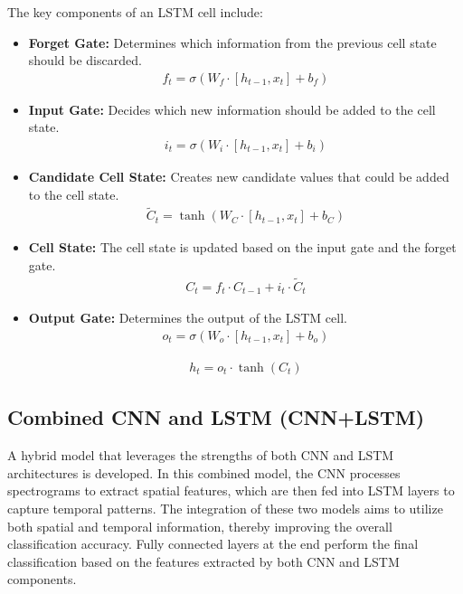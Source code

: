 The key components of an LSTM cell include:
\begin{itemize}
    \item \textbf{Forget Gate:} Determines which information from the previous cell state should be discarded.
    \begin{eqnarray}
        f_t = \sigma(W_f \cdot [h_{t-1}, x_t] + b_f)
    \end{eqnarray}
    
    \item \textbf{Input Gate:} Decides which new information should be added to the cell state.
    \begin{eqnarray}
        i_t = \sigma(W_i \cdot [h_{t-1}, x_t] + b_i)    
    \end{eqnarray}

    \item \textbf{Candidate Cell State:} Creates new candidate values that could be added to the cell state.
    \begin{eqnarray}
        \tilde{C}_t = \tanh(W_C \cdot [h_{t-1}, x_t] + b_C)        
    \end{eqnarray}
    
    \item \textbf{Cell State:} The cell state is updated based on the input gate and the forget gate.
    \begin{eqnarray}
        C_t = f_t \cdot C_{t-1} + i_t \cdot \tilde{C}_t        
    \end{eqnarray}
    
    \item \textbf{Output Gate:} Determines the output of the LSTM cell.
    \begin{eqnarray}
        o_t = \sigma(W_o \cdot [h_{t-1}, x_t] + b_o)        
    \end{eqnarray}
    
    \begin{eqnarray}
        h_t = o_t \cdot \tanh(C_t)        
    \end{eqnarray}
   
\end{itemize}

\subsection{Combined CNN and LSTM (CNN+LSTM)}
A hybrid model that leverages the strengths of both CNN and LSTM architectures is developed. In this combined model, the CNN processes spectrograms to extract spatial features, which are then fed into LSTM layers to capture temporal patterns. The integration of these two models aims to utilize both spatial and temporal information, thereby improving the overall classification accuracy. Fully connected layers at the end perform the final classification based on the features extracted by both CNN and LSTM components.


